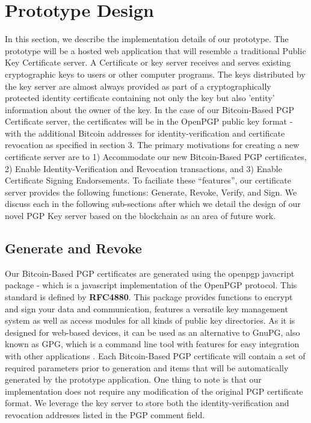 \documentclass{llncs}
\begin{document}
\section{Prototype Design}
In this section, we describe the implementation details of our prototype.  The prototype will be a hosted web application that will resemble a traditional Public Key Certificate server.  A Certificate or key server receives and serves existing cryptographic keys to users or other computer programs.  The keys distributed by the key server are almost always provided as part of a cryptographically protected identity certificate containing not only the key but also 'entity' information about the owner of the key. In the case of our Bitcoin-Based PGP Certificate server, the certificates will be in the OpenPGP public key format - with the additional Bitcoin addresses for identity-verification and certificate revocation as specified in section 3.  The primary motivations for creating a new certificate server are to 1) Accommodate our new Bitcoin-Based PGP certificates, 2) Enable Identity-Verification and Revocation transactions, and 3) Enable Certificate Signing Endorsements.  To faciliate these ``features'', our certificate server provides the following functions: Generate, Revoke, Verify, and Sign.  We discuss each in the following sub-sections after which we detail the design of our novel PGP Key server based on the blockchain as an area of future work.   

\subsection{Generate and Revoke}
Our Bitcoin-Based PGP certificates are generated using the openpgp javacript package - which is a javascript implementation of the OpenPGP protocol.  This standard is defined by \textbf{RFC4880}. This package provides functions to encrypt and sign your data and communication, features a versatile key management system as well as access modules for all kinds of public key directories. As it is designed for web-based devices, it can be used as an alternative to GnuPG, also known as GPG, which is a command line tool with features for easy integration with other applications \cite{gnupg}.  Each Bitcoin-Based PGP certificate will contain a set of required parameters prior to generation and items that will be automatically generated by the prototype application.  One thing to note is that our implementation does not require any modification of the original PGP certificate format.  We leverage the key server to store both the identity-verification and revocation addresses listed in the PGP comment field. 
\end{document}
